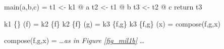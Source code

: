 \begin{minipage}{5in}%
\begin{center}%
\begin{minipage}{4in}%
\begin{AVerb}[numbers=left]
main(a,b,c) = 
  t1 <- k1 @ a
  t2 <- t1 @ b
  t3 <- t2 @ c
  return t3

k1 \{\} (f) = k2 \{f\}
k2 \{f\} (g) = k3 \{f,g\}
k3 \{f,g\} (x) = compose(f,g,x)

compose(f,g,x) = \dots \emph{as in Figure \ref{fig_mil1b}} \dots 
\end{AVerb}
\end{minipage}%
\end{center}%
\end{minipage}%

